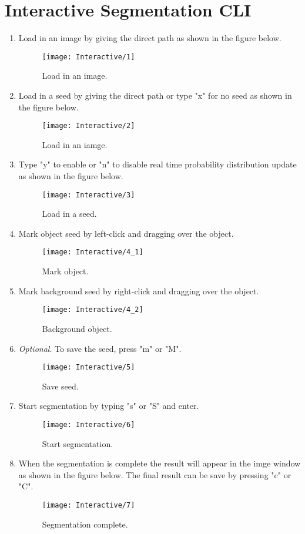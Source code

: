 \documentclass[
11pt, %
a4paper, %
oneside, %
headinclude,footinclude, %
BCOR5mm, %
]{scrartcl}
\begin{document}
\section{Interactive Segmentation CLI}
\begin{enumerate}
\item Load in an image by giving the direct path as shown in the figure below.
	\begin{figure}[h]
		\centering
		\texttt{[image: Interactive/1]}
		\caption{Load in an image.}
	\end{figure}

\item Load in a seed by giving the direct path or type "x" for no seed as shown in the figure below.
\begin{figure}[h]
	\centering
	\texttt{[image: Interactive/2]}
	\caption{Load in an iamge.}
\end{figure}

\item Type "y" to enable or "n" to disable real time probability distribution update as shown in the figure below.
\begin{figure}[h]
	\centering
	\texttt{[image: Interactive/3]}
	\caption{Load in a seed.}
\end{figure}

\newpage
\item Mark object seed by left-click and dragging over the object.
\begin{figure}[h]
	\centering
	\texttt{[image: Interactive/4\_1]}
	\caption{Mark object.}
\end{figure}

\item Mark background seed by right-click and dragging over the object.
\begin{figure}[h]
	\centering
	\texttt{[image: Interactive/4\_2]}
	\caption{Background object.}
\end{figure}

\newpage
\item \textit{Optional}. To save the seed, press "m" or "M".
\begin{figure}[h]
	\centering
	\texttt{[image: Interactive/5]}
	\caption{Save seed.}
\end{figure}

\item Start segmentation by typing "s" or "S" and enter.
\begin{figure}[h]
	\centering
	\texttt{[image: Interactive/6]}
	\caption{Start segmentation.}
\end{figure}

\newpage
\item When the segmentation is complete the result will appear in the imge window as shown in the figure below. The final result can be save by pressing "c" or "C".
\begin{figure}[h]
	\centering
	\texttt{[image: Interactive/7]}
	\caption{Segmentation complete.}
\end{figure}
\end{enumerate}
\end{document}
